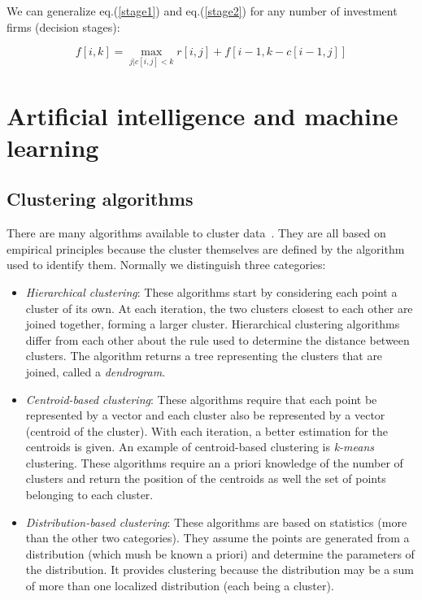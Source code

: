 \documentclass[justified,sixbynine]{tufte-book}
\theoremstyle{plain}%
\theoremstyle{definition}
\theoremstyle{remark}
\begin{document}
\begin{fullwidth}
We can generalize eq.(\ref{stage1}) and eq.(\ref{stage2}) for any number of
investment firms (decision stages):

\begin{equation}
f[i,k]=\max_{j|c[i,j]<k}r[i,j]+f[i-1,k-c[i-1,j]]
\end{equation}

\goodbreak\section{Artificial intelligence and machine learning}


\goodbreak\subsection{Clustering algorithms}


There are many algorithms available to cluster data~\cite{clustering}. They are all based on empirical principles because the cluster themselves are defined by the algorithm used to identify them. Normally we distinguish three categories:
\begin{itemize}
\item {\it Hierarchical clustering}: These algorithms start by considering each point a cluster of its own. At each iteration, the two clusters closest to each other are joined together, forming a larger cluster. Hierarchical clustering algorithms differ from each other about the rule used to determine the distance between clusters. The algorithm returns a tree representing the clusters that are joined, called a {\it dendrogram}.
\item {\it Centroid-based clustering}: These algorithms require that each point be represented by a vector and each cluster also be represented by a vector (centroid of the cluster). With each iteration, a better estimation for the centroids is given. An example of centroid-based clustering is {\it k-means} clustering. These algorithms require an a priori knowledge of the number of clusters and return the position of the centroids as well the set of points belonging to each cluster.
\item {\it Distribution-based clustering}: These algorithms are based on statistics (more than the other two categories). They assume the points are generated from a  distribution (which mush be known a priori) and determine the parameters of the distribution. It provides clustering because the distribution may be a sum of more than one localized distribution (each being a cluster).
\end{itemize}


\end{fullwidth}
\end{document}
